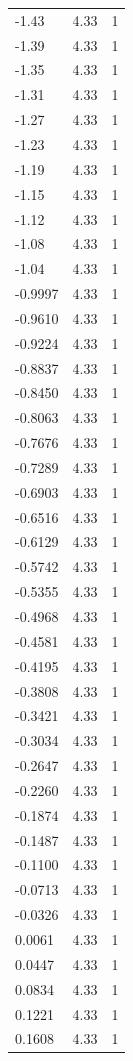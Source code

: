 \begin{longtable}{lrr}
  -1.43 & 4.33 & 1 \\
  -1.39 & 4.33 & 1 \\
  -1.35 & 4.33 & 1 \\
  -1.31 & 4.33 & 1 \\
  -1.27 & 4.33 & 1 \\
  -1.23 & 4.33 & 1 \\
  -1.19 & 4.33 & 1 \\
  -1.15 & 4.33 & 1 \\
  -1.12 & 4.33 & 1 \\
  -1.08 & 4.33 & 1 \\
  -1.04 & 4.33 & 1 \\
  -0.9997 & 4.33 & 1 \\
  -0.9610 & 4.33 & 1 \\
  -0.9224 & 4.33 & 1 \\
  -0.8837 & 4.33 & 1 \\
  -0.8450 & 4.33 & 1 \\
  -0.8063 & 4.33 & 1 \\
  -0.7676 & 4.33 & 1 \\
  -0.7289 & 4.33 & 1 \\
  -0.6903 & 4.33 & 1 \\
  -0.6516 & 4.33 & 1 \\
  -0.6129 & 4.33 & 1 \\
  -0.5742 & 4.33 & 1 \\
  -0.5355 & 4.33 & 1 \\
  -0.4968 & 4.33 & 1 \\
  -0.4581 & 4.33 & 1 \\
  -0.4195 & 4.33 & 1 \\
  -0.3808 & 4.33 & 1 \\
  -0.3421 & 4.33 & 1 \\
  -0.3034 & 4.33 & 1 \\
  -0.2647 & 4.33 & 1 \\
  -0.2260 & 4.33 & 1 \\
  -0.1874 & 4.33 & 1 \\
  -0.1487 & 4.33 & 1 \\
  -0.1100 & 4.33 & 1 \\
  -0.0713 & 4.33 & 1 \\
  -0.0326 & 4.33 & 1 \\
  0.0061 & 4.33 & 1 \\
  0.0447 & 4.33 & 1 \\
  0.0834 & 4.33 & 1 \\
  0.1221 & 4.33 & 1 \\
  0.1608 & 4.33 & 1 \\

\end{longtable}
